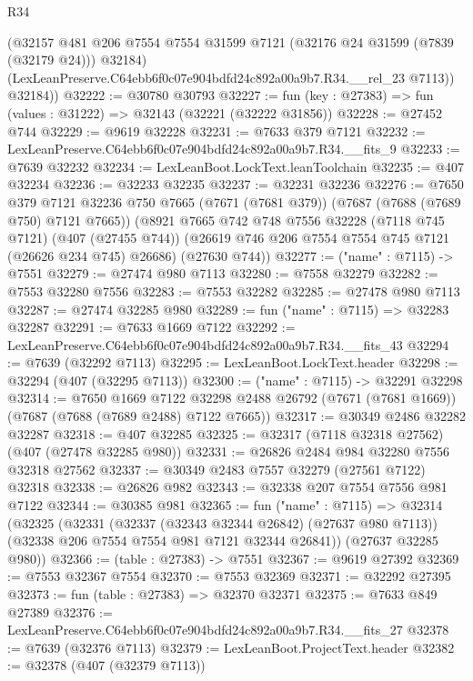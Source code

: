 \begin{lexlean}{R34}
\begin{coremodule}
          (@32157
            @481
            @206
            @7554
            @7554
            @31599
            @7121
            (@32176 @24 @31599 (@7839 (@32179 @24)))
            @32184)
          (LexLeanPreserve.C64ebb6f0c07e904bdfd24c892a00a9b7.R34.__rel_23 @7113))
        @32184))
@32222 := @30780 @30793
@32227 := fun (key : @27383) => fun (values : @31222) => @32143 (@32221 (@32222 @31856))
@32228 := @27452 @744
@32229 := @9619 @32228
@32231 := @7633 @379 @7121
@32232 := LexLeanPreserve.C64ebb6f0c07e904bdfd24c892a00a9b7.R34.__fits_9
@32233 := @7639 @32232
@32234 := LexLeanBoot.LockText.leanToolchain
@32235 := @407 @32234
@32236 := @32233 @32235
@32237 := @32231 @32236
@32276 := @7650
    @379
    @7121
    @32236
    @750
    @7665
    (@7671 (@7681 @379))
    (@7687 (@7688 (@7689 @750) @7121 @7665))
    (@8921
      @7665
      @742
      @748
      @7556
      @32228
      (@7118 @745 @7121)
      (@407 (@27455 @744))
      (@26619 @746 @206 @7554 @7554 @745 @7121 (@26626 @234 @745) @26686)
      (@27630 @744))
@32277 := ("name" : @7115) -> @7551
@32279 := @27474 @980 @7113
@32280 := @7558 @32279
@32282 := @7553 @32280 @7556
@32283 := @7553 @32282
@32285 := @27478 @980 @7113
@32287 := @27474 @32285 @980
@32289 := fun ("name" : @7115) => @32283 @32287
@32291 := @7633 @1669 @7122
@32292 := LexLeanPreserve.C64ebb6f0c07e904bdfd24c892a00a9b7.R34.__fits_43
@32294 := @7639 (@32292 @7113)
@32295 := LexLeanBoot.LockText.header
@32298 := @32294 (@407 (@32295 @7113))
@32300 := ("name" : @7115) -> @32291 @32298
@32314 := @7650
    @1669
    @7122
    @32298
    @2488
    @26792
    (@7671 (@7681 @1669))
    (@7687 (@7688 (@7689 @2488) @7122 @7665))
@32317 := @30349 @2486 @32282 @32287
@32318 := @407 @32285
@32325 := @32317 (@7118 @32318 @27562) (@407 (@27478 @32285 @980))
@32331 := @26826 @2484 @984 @32280 @7556 @32318 @27562
@32337 := @30349 @2483 @7557 @32279 (@27561 @7122) @32318
@32338 := @26826 @982
@32343 := @32338 @207 @7554 @7556 @981 @7122
@32344 := @30385 @981
@32365 := fun ("name" : @7115) =>
  @32314
    (@32325
      (@32331
        (@32337 (@32343 @32344 @26842) (@27637 @980 @7113))
        (@32338 @206 @7554 @7554 @981 @7121 @32344 @26841))
      (@27637 @32285 @980))
@32366 := (table : @27383) -> @7551
@32367 := @9619 @27392
@32369 := @7553 @32367 @7554
@32370 := @7553 @32369
@32371 := @32292 @27395
@32373 := fun (table : @27383) => @32370 @32371
@32375 := @7633 @849 @27389
@32376 := LexLeanPreserve.C64ebb6f0c07e904bdfd24c892a00a9b7.R34.__fits_27
@32378 := @7639 (@32376 @7113)
@32379 := LexLeanBoot.ProjectText.header
@32382 := @32378 (@407 (@32379 @7113))

\end{coremodule}
\end{lexlean}
